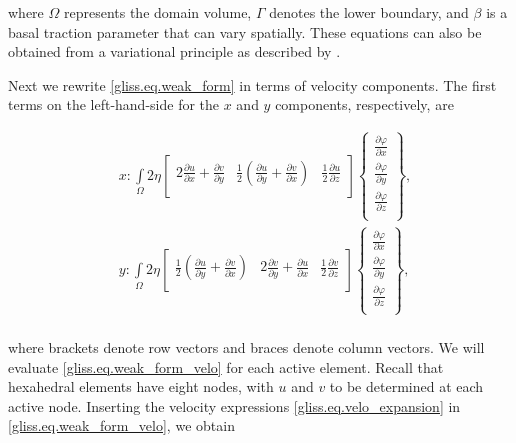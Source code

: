 \noindent
where $\Omega$ represents the domain volume, $\Gamma$ denotes the lower boundary, and $\beta$ is a basal traction parameter
that can vary spatially.  These equations can also be obtained from a variational principle as described by \citet{DUKOWICZ:2010wb}.

Next we rewrite \eqref{gliss.eq.weak_form} in terms of velocity components.
The first terms on the left-hand-side for the $x$ and $y$ components, respectively, are

\begin{equation}
  \label{gliss.eq.weak_form_velo}
  \begin{aligned}
    & x: \int\limits_{\Omega }{2\eta \left[ \begin{matrix}
          2\frac{\partial u}{\partial x}+\frac{\partial v}{\partial y} & \frac{1}{2}\left( \frac{\partial u}{\partial y}+\frac{\partial v}{\partial x} \right) & \frac{1}{2}\frac{\partial u}{\partial z}  \\
\end{matrix} \right]}\left\{ \begin{matrix}
      \frac{\partial \varphi }{\partial x}  \\[6pt]
      \frac{\partial \varphi }{\partial y}  \\[6pt]
      \frac{\partial \varphi }{\partial z}  \\
    \end{matrix} \right\},  \\
    & y: \int\limits_{\Omega }{2\eta \left[ \begin{matrix}
          \frac{1}{2}\left( \frac{\partial u}{\partial y}+\frac{\partial v}{\partial x} \right) & 2\frac{\partial v}{\partial y}+\frac{\partial u}{\partial x} & \frac{1}{2}\frac{\partial v}{\partial z}  \\
        \end{matrix} \right]}\left\{ \begin{matrix}
      \frac{\partial \varphi }{\partial x}  \\[6pt]
      \frac{\partial \varphi }{\partial y}  \\[6pt]
      \frac{\partial \varphi }{\partial z}  \\
    \end{matrix} \right\},  \\
  \end{aligned}
\end{equation}

\noindent
where brackets denote row vectors and braces denote column vectors.
We will evaluate \eqref{gliss.eq.weak_form_velo} for each active element.  Recall that hexahedral elements have eight nodes,
with $u$ and $v$ to be determined at each active node.
Inserting the velocity expressions \eqref{gliss.eq.velo_expansion} in \eqref{gliss.eq.weak_form_velo}, we obtain

